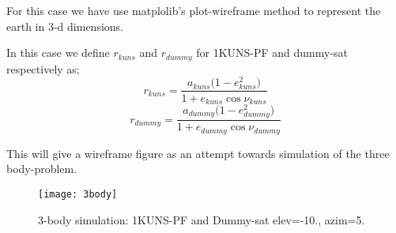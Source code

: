 For this case we have use matplolib's plot-wireframe method to represent the earth in 3-d dimensions.

In this case we define \(r_{kuns}\) and \(r_{dummy}\) for 1KUNS-PF and dummy-sat respectively as;
\[r_{kuns}=\frac{a_{kuns}\big(1-e_{kuns}^2)}{1+e_{kuns} \cos \nu_{kuns}} \]
\[r_{dummy}=\frac{a_{dummy}\big(1-e_{dummy}^2)}{1+e_{dummy} \cos \nu_{dummy}} \]

This will give a wireframe figure as an attempt towards simulation of the three body-problem.
\begin{figure}[h]
	\texttt{[image: 3body]}
	\caption{3-body simulation: 1KUNS-PF and Dummy-sat elev=-10., azim=5.}
	\label{fig:3body-sim}
\end{figure}	




